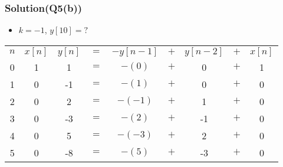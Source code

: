 \documentclass{beamer}
\begin{document}
\begin{frame}
\frametitle{Solution(Q5(b))}

\begin{itemize} \itemsep1pt \parskip0pt 
  \item[] $k=-1$, $y[10]=?$
\end{itemize}

\begin{table}
\def\arraystretch{1.5}
\begin{tabular}{ccccccccc}
\hline
$n$ & $x[n]$ & $y[n]$ & $=$ & $-y[n-1]$ & $+$ & $y[n-2]$ & $+$ & $x[n]$ \\

0 & 1 & 1 & $=$ & $-(0)$ & $+$ & 0 & $+$ & 1 \\ 

1 & 0 & -1 & $=$ & $-(1)$ & $+$ & 0 & $+$ & 0 \\ 

2 & 0 & 2 & $=$ & $-(-1)$ & $+$ & 1 & $+$ & 0 \\ 

3 & 0 & -3 & $=$ & $-(2)$ & $+$ & -1 & $+$ & 0 \\ 

4 & 0 & 5 & $=$ & $-(-3)$ & $+$ & 2 & $+$ & 0 \\

5 & 0 & -8 & $=$ & $-(5)$ & $+$ & -3 & $+$ & 0 \\ 

\hline
\end{tabular}
\end{table}

\end{frame}

\end{document}
